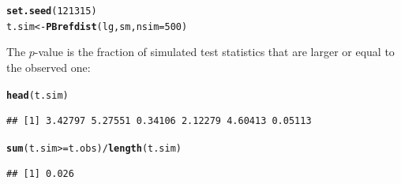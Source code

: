 \documentclass[compress]{beamer}\usepackage[]{graphicx}\usepackage[]{color}
\makeatletter
\newcommand{\hlnum}[1]{\textcolor[rgb]{0.686,0.059,0.569}{#1}}%
\newcommand{\hlopt}[1]{\textcolor[rgb]{0,0,0}{#1}}%
\newcommand{\hlstd}[1]{\textcolor[rgb]{0.345,0.345,0.345}{#1}}%
\newcommand{\hlkwb}[1]{\textcolor[rgb]{0.69,0.353,0.396}{#1}}%
\newcommand{\hlkwc}[1]{\textcolor[rgb]{0.333,0.667,0.333}{#1}}%
\newcommand{\hlkwd}[1]{\textcolor[rgb]{0.737,0.353,0.396}{\textbf{#1}}}%
\newenvironment{kframe}{%
 \def\at@end@of@kframe{}%
 \ifinner\ifhmode%
  \def\at@end@of@kframe{\end{minipage}}%
  \begin{minipage}{\columnwidth}%
 \fi\fi%
 \def\FrameCommand##1{\hskip\@totalleftmargin \hskip-\fboxsep
 \colorbox{shadecolor}{##1}\hskip-\fboxsep
     \hskip-\linewidth \hskip-\@totalleftmargin \hskip\columnwidth}%
 \MakeFramed {\advance\hsize-\width
   \@totalleftmargin\z@ \linewidth\hsize
   \@setminipage}}%
 {\par\unskip\endMakeFramed%
 \at@end@of@kframe}
\newenvironment{knitrout}{}{} %
\newenvironment{sframe}
{\begin{frame} [containsverbatim] }
  {\end{frame}}
\makeatother
\begin{document}
\begin{sframe}

\begin{knitrout}\scriptsize
{}\color{fgcolor}\begin{kframe}
\begin{alltt}
\hlkwd{set.seed}\hlstd{(}\hlnum{121315}\hlstd{)}
\hlstd{t.sim} \hlkwb{<-} \hlkwd{PBrefdist}\hlstd{(lg, sm,} \hlkwc{nsim}\hlstd{=}\hlnum{500}\hlstd{)}
\end{alltt}
\end{kframe}
\end{knitrout}
  
The $p$-value
is the fraction of simulated test statistics that are larger or equal to the
observed one:

\begin{knitrout}\scriptsize
{}\color{fgcolor}\begin{kframe}
\begin{alltt}
\hlkwd{head}\hlstd{(t.sim)}
\end{alltt}
\begin{verbatim}
## [1] 3.42797 5.27551 0.34106 2.12279 4.60413 0.05113
\end{verbatim}
\begin{alltt}
\hlkwd{sum}\hlstd{( t.sim} \hlopt{>=} \hlstd{t.obs )} \hlopt{/} \hlkwd{length}\hlstd{( t.sim )}
\end{alltt}
\begin{verbatim}
## [1] 0.026
\end{verbatim}
\end{kframe}
\end{knitrout}
\end{sframe}
\end{document}
